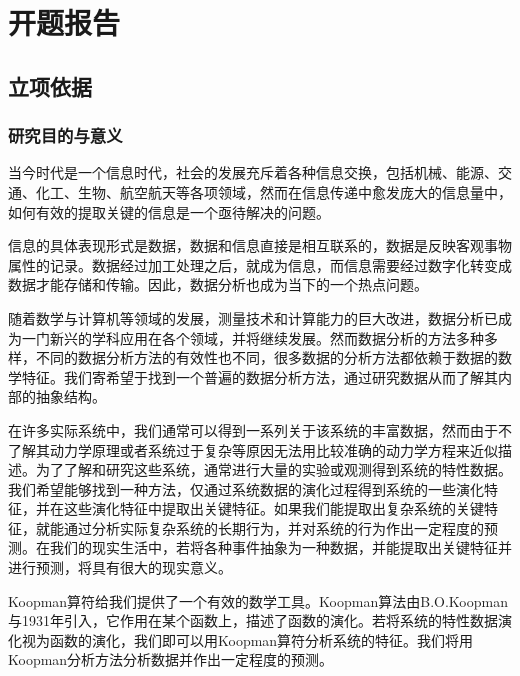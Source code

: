 \chapter{开题报告}

\section{立项依据}
\subsection{研究目的与意义}
当今时代是一个信息时代，社会的发展充斥着各种信息交换，包括机械、能源、交通、化工、生物、航空航天等各项领域，然而在信息传递中愈发庞大的信息量中，如何有效的提取关键的信息是一个亟待解决的问题。

信息的具体表现形式是数据，数据和信息直接是相互联系的，数据是反映客观事物属性的记录。数据经过加工处理之后，就成为信息，而信息需要经过数字化转变成数据才能存储和传输。因此，数据分析也成为当下的一个热点问题。

随着数学与计算机等领域的发展，测量技术和计算能力的巨大改进，数据分析已成为一门新兴的学科应用在各个领域，并将继续发展。然而数据分析的方法多种多样，不同的数据分析方法的有效性也不同，很多数据的分析方法都依赖于数据的数学特征。我们寄希望于找到一个普遍的数据分析方法，通过研究数据从而了解其内部的抽象结构。

在许多实际系统中，我们通常可以得到一系列关于该系统的丰富数据，然而由于不了解其动力学原理或者系统过于复杂等原因无法用比较准确的动力学方程来近似描述。为了了解和研究这些系统，通常进行大量的实验或观测得到系统的特性数据。我们希望能够找到一种方法，仅通过系统数据的演化过程得到系统的一些演化特征，并在这些演化特征中提取出关键特征。如果我们能提取出复杂系统的关键特征，就能通过分析实际复杂系统的长期行为，并对系统的行为作出一定程度的预测。在我们的现实生活中，若将各种事件抽象为一种数据，并能提取出关键特征并进行预测，将具有很大的现实意义。

Koopman算符给我们提供了一个有效的数学工具。Koopman算法由B.O.Koopman与1931年引入，它作用在某个函数上，描述了函数的演化。若将系统的特性数据演化视为函数的演化，我们即可以用Koopman算符分析系统的特征。我们将用Koopman分析方法分析数据并作出一定程度的预测。

